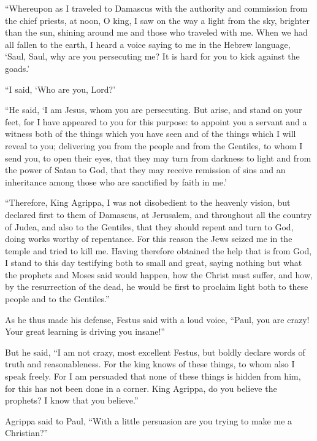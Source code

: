  ``Whereupon as I traveled to Damascus with the authority
and commission from the chief priests,  at noon, O king, I
saw on the way a light from the sky, brighter than the sun, shining
around me and those who traveled with me.  When we had all
fallen to the earth, I heard a voice saying to me in the Hebrew
language, `Saul, Saul, why are you persecuting me? It is hard for you to
kick against the goads.'

 ``I said, `Who are you, Lord?'

``He said, `I am Jesus, whom you are persecuting.  But
arise, and stand on your feet, for I have appeared to you for this
purpose: to appoint you a servant and a witness both of the things which
you have seen and of the things which I will reveal to you;
 delivering you from the people and from the Gentiles, to
whom I send you,  to open their eyes, that they may turn
from darkness to light and from the power of Satan to God, that they may
receive remission of sins and an inheritance among those who are
sanctified by faith in me.'

 ``Therefore, King Agrippa, I was not disobedient to the
heavenly vision,  but declared first to them of Damascus,
at Jerusalem, and throughout all the country of Judea, and also to the
Gentiles, that they should repent and turn to God, doing works worthy of
repentance.  For this reason the Jews seized me in the
temple and tried to kill me.  Having therefore obtained the
help that is from God, I stand to this day testifying both to small and
great, saying nothing but what the prophets and Moses said would happen,
 how the Christ must suffer, and how, by the resurrection
of the dead, he would be first to proclaim light both to these people
and to the Gentiles.''

 As he thus made his defense, Festus said with a loud
voice, ``Paul, you are crazy! Your great learning is driving you
insane!''

 But he said, ``I am not crazy, most excellent Festus, but
boldly declare words of truth and reasonableness.  For the
king knows of these things, to whom also I speak freely. For I am
persuaded that none of these things is hidden from him, for this has not
been done in a corner.  King Agrippa, do you believe the
prophets? I know that you believe.''

 Agrippa said to Paul, ``With a little persuasion are you
trying to make me a Christian?''

